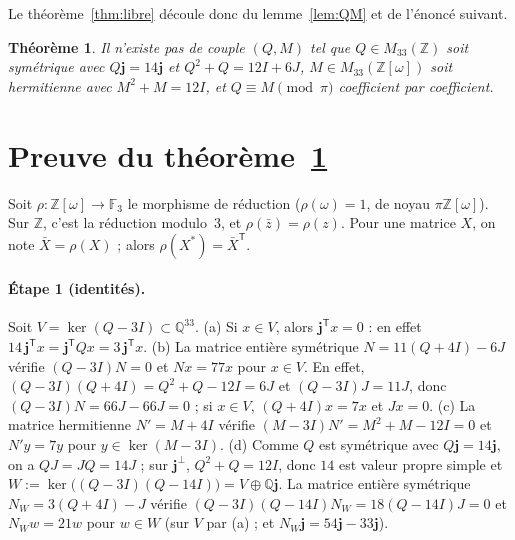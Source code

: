 \documentclass[11pt,a4paper]{article}
\newtheorem{theorem}{Théorème}
\theoremstyle{remark}
\newcommand{\Z}{\mathbb{Z}}
\newcommand{\Q}{\mathbb{Q}}
\newcommand{\F}{\mathbb{F}}
\newcommand{\one}{\mathbf{j}}
\begin{document}
Le théorème~\ref{thm:libre} découle donc du lemme~\ref{lem:QM} et de l'énoncé suivant.

\begin{theorem}\label{thm:matrices}
Il n'existe pas de couple $(Q,M)$ tel que
$Q\in M_{33}(\Z)$ soit symétrique avec $Q\one=14\one$ et $Q^2+Q=12I+6J$, $M\in M_{33}(\Z[\omega])$ soit hermitienne avec $M^2+M=12I$,
et $Q\equiv M\pmod{\pi}$ coefficient par coefficient.
\end{theorem}

\section{Preuve du théorème~\ref{thm:matrices}}

Soit $\rho:\Z[\omega]\to\F_3$ le morphisme de réduction ($\rho(\omega)=1$, de noyau $\pi\Z[\omega]$). Sur $\Z$, c'est la
réduction modulo~3, et $\rho(\bar z)=\rho(z)$. Pour une matrice $X$, on note $\bar X=\rho(X)$ ; alors $\rho(X^*)=\bar X^{\mathsf T}$.

\paragraph{Étape 1 (identités).}
Soit $V=\ker(Q-3I)\subset\Q^{33}$.
(a) Si $x\in V$, alors $\one^{\mathsf T}x=0$ : en effet $14\,\one^{\mathsf T}x=\one^{\mathsf T}Qx=3\,\one^{\mathsf T}x$.
(b) La matrice entière symétrique $N=11(Q+4I)-6J$ vérifie $(Q-3I)N=0$ et $Nx=77x$ pour $x\in V$.
En effet, $(Q-3I)(Q+4I)=Q^2+Q-12I=6J$ et $(Q-3I)J=11J$, donc $(Q-3I)N=66J-66J=0$ ; si $x\in V$, $(Q+4I)x=7x$ et $Jx=0$.
(c) La matrice hermitienne $N'=M+4I$ vérifie $(M-3I)N'=M^2+M-12I=0$ et $N'y=7y$ pour $y\in\ker(M-3I)$.
(d) Comme $Q$ est symétrique avec $Q\one=14\one$, on a $QJ=JQ=14J$ ; sur $\one^\perp$, $Q^2+Q=12I$, donc $14$ est valeur propre
simple et $W:=\ker\bigl((Q-3I)(Q-14I)\bigr)=V\oplus\Q\one$. La matrice entière symétrique $N_W=3(Q+4I)-J$ vérifie
$(Q-3I)(Q-14I)N_W=18(Q-14I)J=0$ et $N_Ww=21w$ pour $w\in W$ (sur $V$ par (a) ; et $N_W\one=54\one-33\one$).
\end{document}
